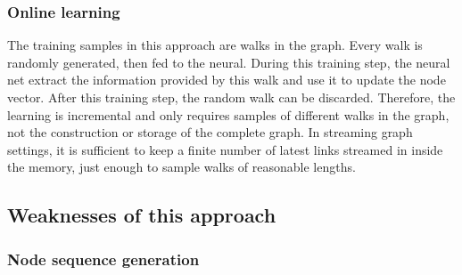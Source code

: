 \documentclass{article}
\begin{document}
\subsubsection{Online learning}
The training samples in this approach are walks in the graph. Every walk is randomly generated, then fed to the neural. During this training step, the neural net extract the information provided by this walk and use it to update the node vector. After this training step,  the random walk can be discarded. Therefore, the learning is incremental and only requires samples of different walks in the graph, not the construction or storage of the complete graph. In streaming graph settings, it is sufficient to keep a finite number of latest links streamed in inside the memory, just enough to sample walks of reasonable lengths.

\subsection{Weaknesses of this approach}

\subsubsection{Node sequence generation}
\end{document}
